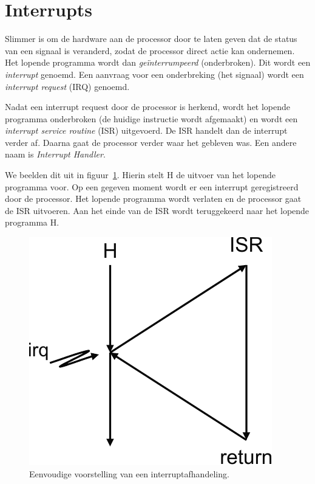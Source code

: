 \section{Interrupts}
Slimmer is om de hardware aan de processor door te laten geven dat de status
van een signaal is veranderd, zodat de processor direct actie kan ondernemen.
Het lopende programma wordt dan \textsl{geïnterrumpeerd} (onderbroken).
Dit wordt een \textsl{interrupt} genoemd. Een aanvraag voor een onderbreking
(het signaal) wordt een \textsl{interrupt request} (IRQ) genoemd.

Nadat een interrupt request door de processor is herkend, wordt het lopende
programma onderbroken (de huidige instructie wordt afgemaakt) en wordt een
\textsl{interrupt service routine} (ISR) uitgevoerd. De ISR handelt dan de
interrupt verder af. Daarna gaat de processor verder waar het gebleven was.
Een andere naam is \textsl{Interrupt Handler}.

We beelden dit uit in figuur~\ref{fig:intsimpleinterruptdispatch}. Hierin
stelt \textsf{H} de uitvoer van het lopende programma voor. Op een gegeven
moment wordt er een interrupt geregistreerd door de processor. Het lopende
programma wordt verlaten en de processor gaat de ISR uitvoeren. Aan het einde
van de ISR wordt teruggekeerd naar het lopende programma \textsf{H}.

\begin{figure}[!ht]
\centering
\includegraphics[scale=\figscale]{images/intsimpleinterruptdispatch}
\caption{Eenvoudige voorstelling van een interruptafhandeling.}
\label{fig:intsimpleinterruptdispatch}
\end{figure}

